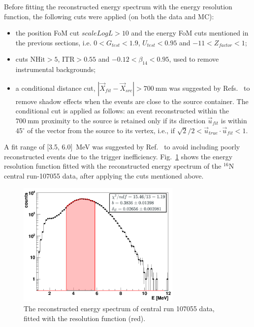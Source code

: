 Before fitting the reconstructed energy spectrum with the energy resolution function, the following cuts were applied (on both the data and MC): 

\begin{itemize}
\item the position FoM cut $scaleLogL>10$ and the energy FoM cuts mentioned in the previous sections, i.e. $0<G_{test}<1.9$, $U_{test}<0.95$ and $-11<Z_{factor}<1$;

\item cuts $\mathrm{NHit}>5$, $\mathrm{ITR}>0.55$ and $-0.12<\beta_{14}<0.95$, used to remove instrumental backgrounds;

\item a conditional distance cut, $|\vec{X}_{fit}-\vec{X}_{src}|>700~$mm was suggested by Refs.~\cite{leta,waterunidoc} to remove shadow effects when the events are close to the source container. The conditional cut is applied as follows: an event reconstructed within the $700~ \mathrm{mm}$ proximity to the source is retained only if its direction $\vec{u}_{fit}$ is within 45$^\circ$ of the vector from the source to its vertex, i.e., if $\sqrt2/2<\vec{u}_{true}\cdot \vec{u}_{fit}<1$.
\end{itemize}

A fit range of [3.5, 6.0]~MeV was suggested by Ref.~\cite{waterunidoc} to avoid including poorly reconstructed events due to the trigger inefficiency. Fig.~\ref{fittedEnergyResol} shows the energy resolution function fitted with the reconstructed energy spectrum of the $^{16}$N central run-107055 data, after applying the cuts mentioned above.
\begin{figure}
	\centering
	\includegraphics[width=8cm]{N16data_energy_fitted_107055.png}
	\caption[The reconstructed energy spectrum fitted with resolution function.]{The reconstructed energy spectrum of central run 107055 data, fitted with the resolution function (red).\label{fittedEnergyResol}}
\end{figure}

